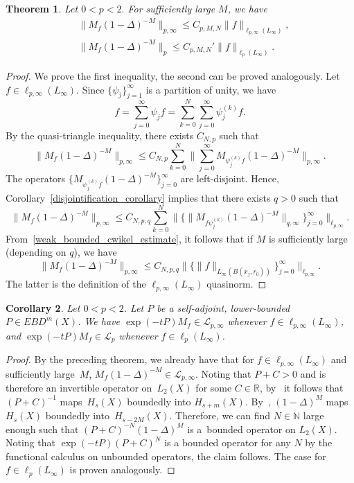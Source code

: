 \documentclass[pdftex]{sigma}
\numberwithin{equation}{section}
\newtheorem{Theorem}{Theorem}[section]
\newtheorem{Corollary}[Theorem]{Corollary}
\begin{document}
\begin{Theorem}%
 Let $0<p<2.$ For sufficiently large $M$, we have
 \begin{align*}
 &\big\|M_f(1-\Delta)^{-M}\big\|_{p,\infty}\leq C_{p,M,N}\|f\|_{\ell_{p,\infty}(L_\infty)},\\
 &\big\|M_f(1-\Delta)^{-M}\big\|_{p}\leq C_{p,M,N}'\|f\|_{\ell_{p}(L_\infty)}.
 \end{align*}
\end{Theorem}
\begin{proof}
 We prove the first inequality, the second can be proved analogously. Let $f \in \ell_{p,\infty}(L_\infty).$
 Since $\{\psi_j\}_{j=1}^\infty$ is a partition of unity, we have
 \[
 f = \sum_{j=0}^\infty \psi_jf = \sum_{k=0}^N \sum_{j=0}^\infty \psi_{j}^{(k)}f.
 \]
 By the quasi-triangle inequality, there exists $C_{N,p}$ such that
 \[
 \big\|M_f(1-\Delta)^{-M}\big\|_{p,\infty} \leq C_{N,p}\sum_{k=0}^N \Bigg\| \sum_{j=0}^\infty M_{\psi_j^{(k)}f} (1-\Delta)^{-M}\Bigg\|_{p,\infty}.
 \]
 The operators $\big\{M_{\psi_j^{(k)}f}(1-\Delta)^{-M}\big\}_{j=0}^\infty$ are left-disjoint. Hence, Corollary~\ref{disjointification_corollary} implies that
 there exists $q>0$ such that
 \[
 \big\|M_f(1-\Delta)^{-M}\big\|_{p,\infty} \leq C_{N,p,q}\sum_{k=0}^N \big\| \big\{\big\|M_{f\psi_j^{(k)}}(1-\Delta)^{-M}\big\|_{q,\infty}\big\}_{j=0}^\infty\big\|_{\ell_{p,\infty}}.
 \]
 From~\eqref{weak_bounded_cwikel_estimate}, it follows that if $M$ is sufficiently large (depending on $q$), we have
 \[
 \big\|M_f(1-\Delta)^{-M}\big\|_{p,\infty}\leq C_{N,p,q}\big\| \big\{\|f\|_{L_{\infty}(B(x_j,r_0))}\big\}_{j=0}^\infty\big\|_{\ell_{p,\infty}}.
 \]
 The latter is the definition of the $\ell_{p,\infty}(L_\infty)$ quasinorm.
\end{proof}

\begin{Corollary} \label{C:Cwikel} Let $0<p<2$. Let $P$ be a self-adjoint, lower-bounded $P \in EBD^m(X)$. We have $\exp(-tP)M_f \in \mathcal{L}_{p,\infty}$ whenever $f\in \ell_{p,\infty}(L_\infty)$, and $\exp(-tP)M_f \in \mathcal{L}_{p}$ whenever $f\in \ell_{p}(L_\infty)$.
\end{Corollary}
\begin{proof}
By the preceding theorem, we already have that for $f\in \ell_{p,\infty}(L_\infty)$ and sufficiently large~$M$, $M_f(1-\Delta)^{-M} \in \mathcal{L}_{p,\infty}$. Noting that $P+C>0$ and is therefore an invertible operator on~$L_2(X)$ for some $C\in \mathbb{R}$, by~\cite[Proposition~4.4]{Kordyukov1991} it follows that $(P+C)^{-1}$ maps~$H_s(X)$ boundedly into $H_{s+m}(X)$. By~\cite[Theorem~3.9]{Kordyukov1991}, $(1-\Delta)^M$ maps $H_s(X)$ boundedly into~$H_{s-2M}(X)$. Therefore, we can find $N\in \mathbb{N}$ large enough such that $(P+C)^{-N}(1-\Delta)^M$ is a~bounded operator on $L_2(X)$. Noting that $\exp(-tP) (P+C)^N$ is a bounded operator for any $N$ by the functional calculus on unbounded operators, the claim follows. The case for $f \in \ell_p(L_\infty)$ is proven analogously.
\end{proof}
\end{document}
